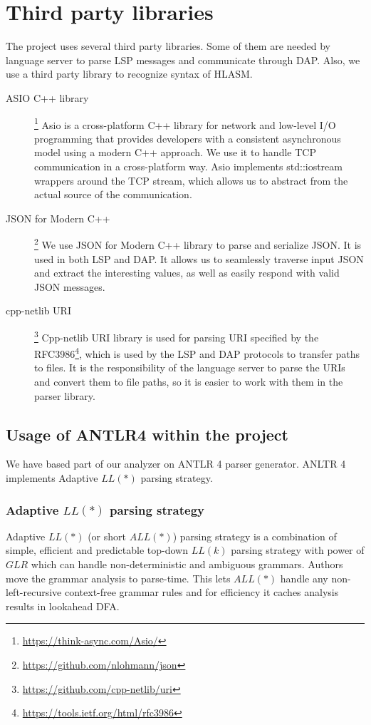 \chapter{Third party libraries}
\label{3rd_party}
The project uses several third party libraries. Some of them are needed by language server to parse LSP messages and communicate through DAP. Also, we use a third party library to recognize syntax of HLASM.

\begin{description}
	\item [ASIO C++ library]\hspace{-4px}\footnote{\url{https://think-async.com/Asio/}}
	Asio is a cross-platform C++ library for network and low-level I/O programming that provides developers with a consistent asynchronous model using a modern C++ approach. We use it to handle TCP communication in a cross-platform way. Asio implements std::iostream wrappers around the TCP stream, which allows us to abstract from the actual source of the communication.
	
	\item [JSON for Modern C++]\hspace{-4px}\footnote{\url{https://github.com/nlohmann/json}} We use JSON for Modern C++ library to parse and serialize JSON. It is used in both LSP and DAP. It allows us to seamlessly traverse input JSON and extract the interesting values, as well as easily respond with valid JSON messages.
	
	\item [cpp-netlib URI]\hspace{-4px}\footnote{\url{https://github.com/cpp-netlib/uri}} Cpp-netlib URI library is used for parsing URI specified by the RFC3986\footnote{\url{https://tools.ietf.org/html/rfc3986}}, which is used by the LSP and DAP protocols to transfer paths to files. It is the responsibility of the language server to parse the URIs and convert them to file paths, so it is easier to work with them in the parser library. 
\end{description}

\section{Usage of ANTLR4 within the project}
\label{antlr}
We have based part of our analyzer on ANTLR 4 parser generator. ANLTR 4 implements Adaptive $LL(*)$ \cite{parr2014adaptive} parsing strategy.

\subsection{Adaptive $LL(*)$ parsing strategy}
Adaptive $LL(*)$ (or short $ALL(*)$) parsing strategy is a combination of simple, efficient and predictable top-down $LL(k)$ parsing strategy with power of $GLR$ which can handle non-deterministic and ambiguous grammars. 
Authors move the grammar analysis to parse-time. This lets $ALL(*)$ handle any non-left-recursive context-free grammar rules and for efficiency it caches analysis results in lookahead DFA.

